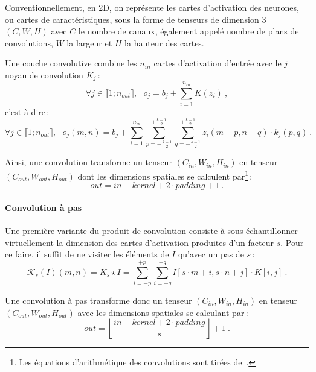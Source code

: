 Conventionnellement, en 2D, on représente les cartes d'activation des neurones, ou cartes de caractéristiques, sous la forme de tenseurs de dimension 3 $(C, W, H)$ avec $C$ le nombre de canaux, également appelé nombre de plans de convolutions, $W$ la largeur et $H$ la hauteur des cartes.

Une couche convolutive combine les $n_{in}$ cartes d'activation d'entrée avec le $j$\ieme{} noyau de convolution $K_j$\,:
\begin{equation}
\forall j \in \llbracket 1;n_{out} \rrbracket,~~~o_j = b_j + \sum_{i=1}^{n_{in}} K(z_i)~,
\end{equation}
c'est-à-dire\,:
\begin{equation}
\forall j \in \llbracket 1;n_{out} \rrbracket,~~~o_j(m, n) = b_j + \sum_{i=1}^{n_{in}} \sum_{p=-\frac{k-1}{2}}^{+\frac{k-1}{2}} \sum_{q=-\frac{k-1}{2}}^{+\frac{k-1}{2}} z_i(m - p, n - q) \cdot k_j(p, q)~.
\end{equation}

Ainsi, une convolution transforme un tenseur $(C_{in}, W_{in}, H_{in})$ en tenseur $(C_{out}, W_{out}, H_{out})$ dont les dimensions spatiales se calculent par\footnote{Les équations d'arithmétique des convolutions sont tirées de~\citet{dumoulin_guide_2016}.}\,:
\begin{equation}
\mathit{out} = \mathit{in} - \mathit{kernel} + 2\cdot \mathit{padding} + 1~.
\end{equation}

\paragraph{Convolution à pas}

Une première variante du produit de convolution consiste à sous-échantillonner virtuellement la dimension des cartes d'activation produites d'un facteur $s$. Pour ce faire, il suffit de ne visiter les éléments de $I$ qu'avec un pas de $s$\,:
\begin{equation}
\mathcal{K}_s(I)(m,n) = K_s \star I = \sum_{i=-p}^{+p} \sum_{i=-q}^{+q} I[s \cdot m + i, s \cdot n + j] \cdot K[i, j]~.
\end{equation}

Une convolution à pas transforme donc un tenseur $(C_{in}, W_{in}, H_{in})$ en tenseur $(C_{out}, W_{out}, H_{out})$ avec les dimensions spatiales se calculant par\,:
\begin{equation}
\mathit{out} = \left\lfloor \frac{\mathit{in} - \mathit{kernel} + 2 \cdot \mathit{padding}}{\mathit{s}}\right\rfloor + 1~.
\end{equation}

